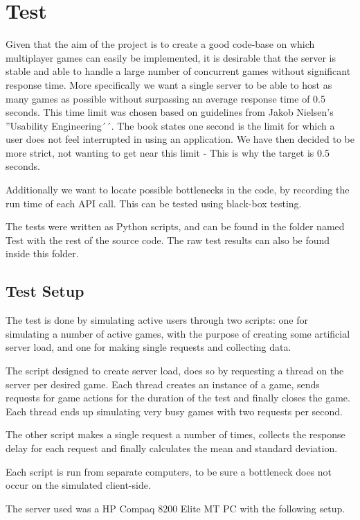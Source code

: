 \section{Test} \label{sec:test}
Given that the aim of the project is to create a good code-base on which multiplayer games can easily be implemented, it is desirable that the server is stable and able to handle a large number of concurrent games without significant response time. More specifically we want a single server to be able to host as many games as possible without surpassing an average response time of 0.5 seconds. This time limit was chosen based on guidelines from Jakob Nielsen's ''Usability Engineering´´.\cite{response-time} The book states one second is the limit for which a user does not feel interrupted in using an application. We have then decided to be more strict, not wanting to get near this limit - This is why the target is 0.5 seconds.

Additionally we want to locate possible bottlenecks in the code, by recording the run time of each API call. This can be tested using black-box testing.

The tests were written as Python scripts, and can be found in the folder named Test with the rest of the source code. The raw test results can also be found inside this folder.

\subsection{Test Setup} \label{sec:testSetup}
The test is done by simulating active users through two scripts: one for simulating a number of active games, with the purpose of creating some artificial server load, and one for making single requests and collecting data.

The script designed to create server load, does so by requesting a thread on the server per desired game. Each thread creates an instance of a game, sends requests for game actions for the duration of the test and finally closes the game. Each thread ends up simulating very busy games with two requests per second. 

The other script makes a single request a number of times, collects the response delay for each request and finally calculates the mean and standard deviation.

Each script is run from separate computers, to be sure a bottleneck does not occur on the simulated client-side.

The server used was a HP Compaq 8200 Elite MT PC with the following setup.

